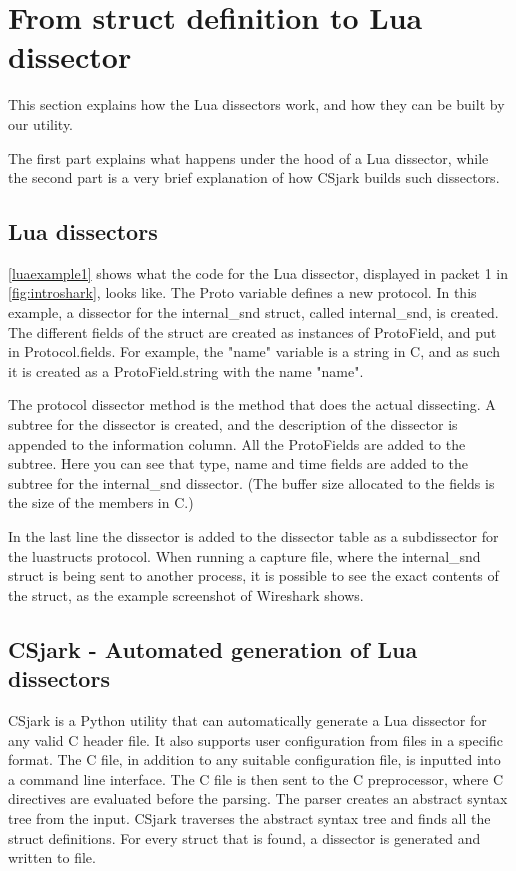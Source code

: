 \section*{From struct definition to Lua dissector}
This section explains how the Lua dissectors work, and how they can be built by our utility.

The first part explains what happens under the hood of a Lua dissector, while 
the second part is a very brief explanation of how CSjark builds such dissectors.

\subsection*{Lua dissectors}

\autoref{luaexample1} shows what the code for the Lua dissector, displayed in packet 1 in \autoref{fig:introshark}, looks like.
The Proto variable defines a new protocol. In this example, a dissector for the internal\_snd struct, called internal\_snd, is created. 
The different fields of the struct are created as instances of ProtoField, and put in Protocol.fields.
For example, the "name" variable is a string in C, and as such it is created as a ProtoField.string with the 
name "name".

The protocol dissector method is the method that does the actual dissecting.
A subtree for the dissector is created, and the description of the dissector is appended to the information column.
All the ProtoFields are added to the subtree. Here you can see that type, name and time fields are added to the subtree for the internal\_snd dissector.
(The buffer size allocated to the fields is the size of the members in C.)

In the last line the dissector is added to the dissector table as a subdissector for the luastructs protocol.
When running a capture file, where the internal\_snd struct is being sent to another process, it is possible to see the exact contents of the struct, as the example screenshot of Wireshark shows.



\subsection*{CSjark - Automated generation of Lua dissectors}
CSjark is a Python utility that can automatically generate a Lua dissector for 
any valid C header file. It also supports user configuration from files in a specific format.
The C file, in addition to any suitable configuration file, is inputted into a command line interface.
The C file is then sent to the C preprocessor, where C directives are evaluated before the parsing.
The parser creates an abstract syntax tree from the input.
CSjark traverses the abstract syntax tree and finds all the struct definitions.
For every struct that is found, a dissector is generated and written to file.






